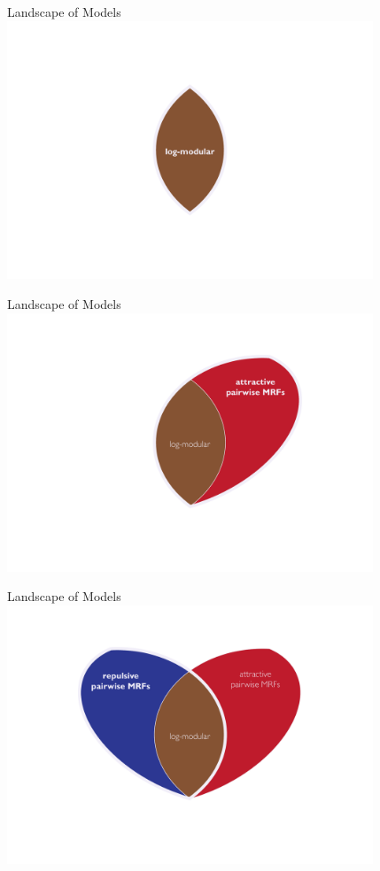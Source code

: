 \documentclass[mathserif]{beamer}
\begin{document}
\begin{frame}{Landscape of Models}
\centering
\includegraphics[width=4.3in]{figures/venn01.pdf}
\end{frame}

\begin{frame}{Landscape of Models}
\centering
\includegraphics[width=4.3in]{figures/venn02.pdf}
\end{frame}

\begin{frame}{Landscape of Models}
\centering
\includegraphics[width=4.3in]{figures/venn03.pdf}
\end{frame}
\end{document}

